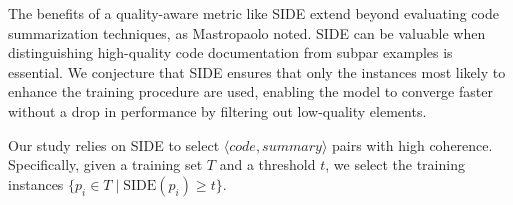 The benefits of a quality-aware metric like SIDE extend beyond evaluating code summarization techniques, as Mastropaolo \etal \cite{mastropaolo2024evaluating} noted. SIDE can be valuable when distinguishing high-quality code documentation from subpar examples is essential. We conjecture that SIDE ensures that only the instances most likely to enhance the training procedure are used, enabling the model to converge faster without a drop in performance by filtering out low-quality elements.

Our study relies on SIDE to select $\langle code, summary \rangle$ pairs with high coherence. Specifically, given a training set $T$ and a threshold $t$, we select the training instances $\{ p_{i} \in T \mid \text{SIDE}(p_{i}) \ge t \}$. 
